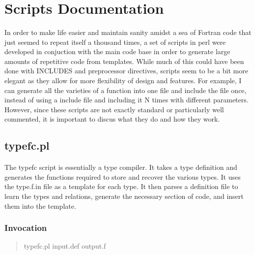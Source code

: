 \documentclass{article}
\begin{document}
\section{Scripts Documentation}
\paragraph{}
In order to make life easier and maintain sanity amidst a sea of Fortran code that just seemed to repeat itself a thousand times, a set of scripts in perl were developed in conjuction with the main code base in order to generate large amounts of repetitive code from templates. While much of this could have been done with INCLUDES and preprocessor directives, scripts seem to be a bit more elegant as they allow for more flexibility of design and features. For example, I can generate all the varieties of a function into one file and include the file once, instead of using a include file and including it N times with different parameters. However, since these scripts are not exactly standard or particularly well commented, it is important to discus what they do and how they work.
\subsection{typefc.pl}
\label{sec.typefc}
\paragraph{}
The typefc script is essentially a type compiler. It takes a type definition and generates the functions required to store and recover the various types. It uses the type.f.in file as a template for each type. It then parses a definition file to learn the types and relations, generate the necessary section of code, and insert them into the template.
\subsubsection{Invocation}
\begin{quote}
   typefc.pl input.def output.f
\end{quote}
\end{document}
